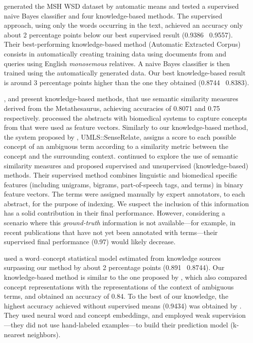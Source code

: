 \textcite{jimenoyepes2011a} generated the MSH WSD dataset by automatic means and tested a supervised naive Bayes classifier and four knowledge-based methods.
The supervised approach, using only the words occurring in the text, achieved an accuracy only about 2 percentage points below our best supervised result (0.9386 \vs\ 0.9557).
Their best-performing knowledge-based method (Automatic Extracted Corpus) consists in automatically creating training data using documents from  and queries using English \textit{monosemous} relatives.
A naive Bayes classifier is then trained using the automatically generated data.
Our best knowledge-based result is around 3 percentage points higher than the one they obtained (0.8744 \vs\ 0.8383).

\textcite{garla2013a}, and \textcite{mcinnes2013a} present knowledge-based methods, that use semantic similarity measures derived from the  Metathesaurus, achieving accuracies of 0.8071 and 0.75 respectively.
\textcite{garla2013a} processed the abstracts with biomedical  systems to capture concepts from  that were used as feature vectors.
Similarly to our knowledge-based method, the system proposed by \textcite{mcinnes2013a}, UMLS::SenseRelate, assigns a score to each possible concept of an ambiguous term according to a similarity metric between the concept and the surrounding context.
\textcite{mcinnes2014a} continued to explore the use of semantic similarity measures and proposed supervised and unsupervised (knowledge-based) methods.
Their supervised method combines linguistic and biomedical specific features (including unigrams, bigrams, part-of-speech tags, and  terms) in binary feature vectors.
The  terms were assigned manually by expert annotators, to each abstract, for the purpose of indexing.
We suspect the inclusion of this information has a solid contribution in their final performance.
However, considering a scenario where this \textit{ground-truth} information is not available---for example, in recent publications that have not yet been annotated with  terms---their supervised final performance (0.97) would likely decrease.

\textcite{jimenoyepes2015a} used a word--concept statistical model estimated from knowledge sources surpassing our method by about 2 percentage points (0.891 \vs\ 0.8744).
Our knowledge-based method is similar to the one proposed by \textcite{tulkens2016a}, which also compared concept representations with the representations of the context of ambiguous terms, and obtained an accuracy of 0.84.
To the best of our knowledge, the highest accuracy achieved without supervised means (0.9434) was obtained by \textcite{sabbir2016a}.
They used neural word and concept embeddings, and employed weak supervision---they did not use hand-labeled examples---to build their prediction model (k-nearest neighbors).

